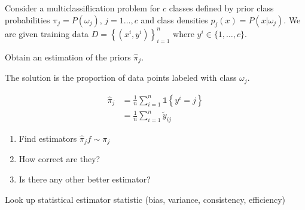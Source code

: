 \begin{exercise}{}{} Consider a multiclassiflication problem for
$c$ classes defined by prior class probabilities
$\pi_j = P(\omega_j),\, j=1\dots, c$ and class densities
$p_j(x) = P(x|\omega_j)$. We are given training data
$D = \left\{ (x^i, y^i) \right\}_{i=1}^n$ where $y^i \in \{1, \dots, c\}$.

Obtain an estimation of the priors $\hat\pi_j$.


The solution is the proportion of data points labeled with class $\omega_j$.

\tcblower

\begin{align*}
  \hat\pi_j &= \frac{1}{n} \sum_{i=1}^n \mathbb{1}\left\{ y^i = j \right\} \\
  &= \frac{1}{n} \sum_{i=1}^n \tilde{y}_{ij}
\end{align*}

\end{exercise}

\begin{exercise}{}{}
\begin{enumerate}
  \item Find estimators $\hat\pi_j f\sim\pi_j$
  \item How correct are they?
  \item Is there any other better estimator?
\end{enumerate}

\begin{hint}
  Look up statistical estimator statistic (bias, variance, consistency, efficiency)
\end{hint}
\end{exercise}
